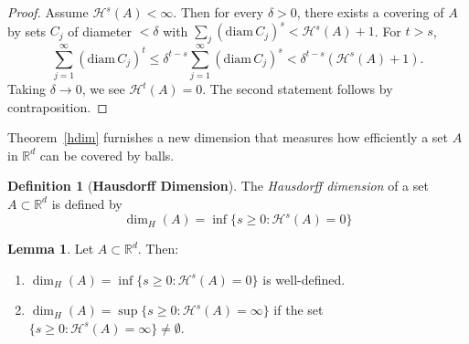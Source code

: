\documentclass[12pt,a4paper]{report}
\theoremstyle{definition}
\newtheorem{lemma}{Lemma}
\newtheorem{definition}{Definition}
\begin{document}
\begin{proof}
Assume \(\mathcal{H}^s(A) < \infty\). Then for every \(\delta > 0\), there exists a covering of \(A\) by sets \(C_j\) of diameter \(< \delta\) with \(\sum_j (\mathrm{diam}\, C_j)^s < \mathcal{H}^s(A) + 1\). For \(t > s\),
\[
\sum_{j=1}^\infty (\mathrm{diam}\, C_j)^t \leq \delta^{t-s} \sum_{j=1}^\infty (\mathrm{diam}\, C_j)^s < \delta^{t-s} (\mathcal{H}^s(A) + 1).
\]
Taking \(\delta \to 0\), we see \(\mathcal{H}^t(A) = 0\). The second statement follows by contraposition.

\end{proof}

Theorem~\ref{hdim} furnishes a new dimension that measures how efficiently a set $A$ in $\mathbb{R}^d$ can be covered by balls.
\begin{definition}[\textbf{Hausdorff Dimension}]
The \textit{Hausdorff dimension} of a set $A \subset \mathbb{R}^d$ is defined by
\[
\dim_H(A) = \inf\{s \geq 0: \mathcal{H}^s(A) = 0\}
\]
\end{definition}

\begin{lemma}
Let $A \subset \mathbb{R}^d$. Then:
\begin{enumerate}
\item
\( \dim_H(A) = \inf \{ s \geq 0 : \mathcal{H}^s(A) = 0 \} \) is well-defined.
\item
\( \dim_H(A) = \sup \{ s \geq 0 : \mathcal{H}^s(A) = \infty \} \) if the set \( \{ s \geq 0 : \mathcal{H}^s(A) = \infty \} \neq \emptyset \).
\end{enumerate}
\end{lemma}
\end{document}
